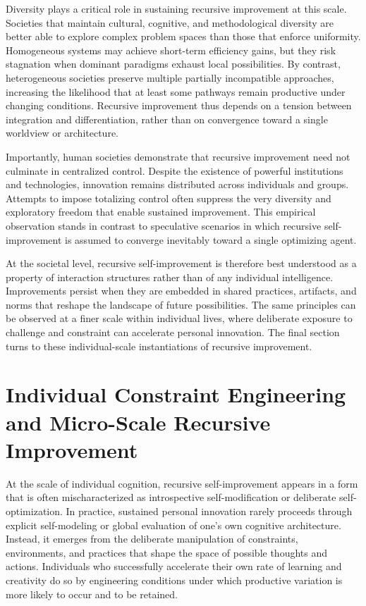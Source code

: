 \documentclass[11pt]{article}
\begin{document}
Diversity plays a critical role in sustaining recursive improvement at this scale. Societies that maintain cultural, cognitive, and methodological diversity are better able to explore complex problem spaces than those that enforce uniformity. Homogeneous systems may achieve short-term efficiency gains, but they risk stagnation when dominant paradigms exhaust local possibilities. By contrast, heterogeneous societies preserve multiple partially incompatible approaches, increasing the likelihood that at least some pathways remain productive under changing conditions. Recursive improvement thus depends on a tension between integration and differentiation, rather than on convergence toward a single worldview or architecture.

Importantly, human societies demonstrate that recursive improvement need not culminate in centralized control. Despite the existence of powerful institutions and technologies, innovation remains distributed across individuals and groups. Attempts to impose totalizing control often suppress the very diversity and exploratory freedom that enable sustained improvement. This empirical observation stands in contrast to speculative scenarios in which recursive self-improvement is assumed to converge inevitably toward a single optimizing agent.

At the societal level, recursive self-improvement is therefore best understood as a property of interaction structures rather than of any individual intelligence. Improvements persist when they are embedded in shared practices, artifacts, and norms that reshape the landscape of future possibilities. The same principles can be observed at a finer scale within individual lives, where deliberate exposure to challenge and constraint can accelerate personal innovation. The final section turns to these individual-scale instantiations of recursive improvement.

\section{Individual Constraint Engineering and Micro-Scale Recursive Improvement}

At the scale of individual cognition, recursive self-improvement appears in a form that is often mischaracterized as introspective self-modification or deliberate self-optimization. In practice, sustained personal innovation rarely proceeds through explicit self-modeling or global evaluation of one’s own cognitive architecture. Instead, it emerges from the deliberate manipulation of constraints, environments, and practices that shape the space of possible thoughts and actions. Individuals who successfully accelerate their own rate of learning and creativity do so by engineering conditions under which productive variation is more likely to occur and to be retained.
\end{document}
